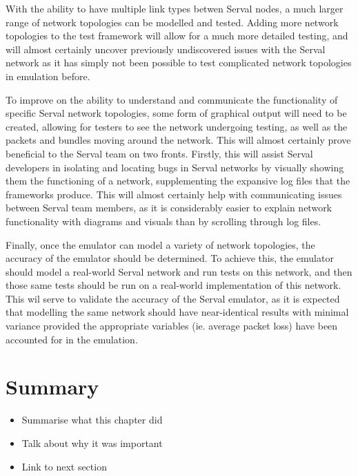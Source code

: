 With the ability to have multiple link types betwen Serval nodes, a much larger range of network topologies can be modelled and tested.
Adding more network topologies to the test framework will allow for a much more detailed testing, and will almost certainly uncover previously undiscovered issues with the Serval network as it has simply not been possible to test complicated network topologies in emulation before.

To improve on the ability to understand and communicate the functionality of specific Serval network topologies, some form of graphical output will need to be created, allowing for testers to see the network undergoing testing, as well as the packets and bundles moving around the network.
This will almost certainly prove beneficial to the Serval team on two fronts. 
Firstly, this will assist Serval developers in isolating and locating bugs in Serval networks by visually showing them the functioning of a network, supplementing the expansive log files that the frameworks produce.
This will almost certainly help with communicating issues between Serval team members, as it is considerably easier to explain network functionality with diagrams and visuals than by scrolling through log files.

Finally, once the emulator can model a variety of network topologies, the accuracy of the emulator should be determined.
To achieve this, the emulator should model a real-world Serval network and run tests on this network, and then those same tests should be run on a real-world implementation of this network.
This wil serve to validate the accuracy of the Serval emulator, as it is expected that modelling the same network should have near-identical results with minimal variance provided the appropriate variables (ie. average packet loss) have been accounted for in the emulation.

\section{Summary}
\begin{itemize}
    \item Summarise what this chapter did
    \item Talk about why it was important
    \item Link to next section
\end{itemize}

